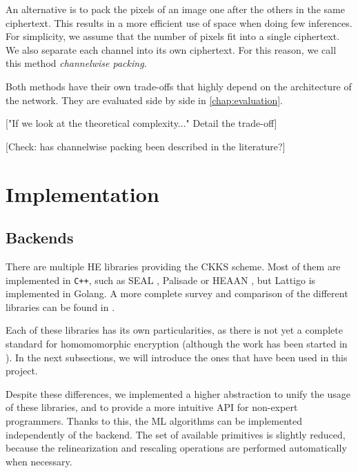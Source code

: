 \documentclass[a4paper,11pt,oneside]{report}
\begin{document}
An alternative is to pack the pixels of an image one after the others in the same ciphertext. This results in a more efficient use of space when doing few inferences. For simplicity, we assume that the number of pixels fit into a single ciphertext. We also separate each channel into its own ciphertext. For this reason, we call this method \emph{channelwise packing}.

Both methods have their own trade-offs that highly depend on the architecture of the network. They are evaluated side by side in \autoref{chap:evaluation}.

["If we look at the theoretical complexity..." Detail the trade-off]

[Check: has channelwise packing been described in the literature?]


\chapter{Implementation}



\section{Backends}

There are multiple HE libraries providing the CKKS scheme. Most of them are implemented in \texttt{C++}, such as SEAL \cite{microsoft_corporation_microsoft_2022}, Palisade \cite{palisade_palisade_2022} or HEAAN \cite{cryptolab_inc_heaan_2022}, but Lattigo \cite{tune_insight_sa_lattigo_2022} is implemented in Golang. A more complete survey and comparison of the different libraries can be found in \cite{viand_sok_2021}.

Each of these libraries has its own particularities, as there is not yet a complete standard for homomomorphic encryption (although the work has been started in \cite{lauter_homomorphic_2021-1}). In the next subsections, we will introduce the ones that have been used in this project.

Despite these differences, we implemented a higher abstraction to unify the usage of these libraries, and to provide a more intuitive API for non-expert programmers. Thanks to this, the ML algorithms can be implemented independently of the backend. The set of available primitives is slightly reduced, because the relinearization and rescaling operations are performed automatically when necessary.
\end{document}
